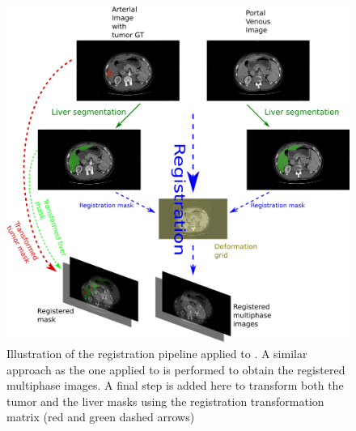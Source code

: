 \begin{figure}[th!]
\centering
\includegraphics[width=0.9\linewidth]{../HistologicalGradePrediction/images/GDB/GDB_registration_pipeline_vertical}
\caption{Illustration of the registration pipeline applied to \textbf{}. A similar approach as the one applied to \textbf{} is performed to obtain the registered multiphase images. A final step is added here to transform both the tumor and the liver masks using the registration transformation matrix (red and green dashed arrows)}
\label{fig:GDB_registration_pipeline_vertical}
\end{figure}

